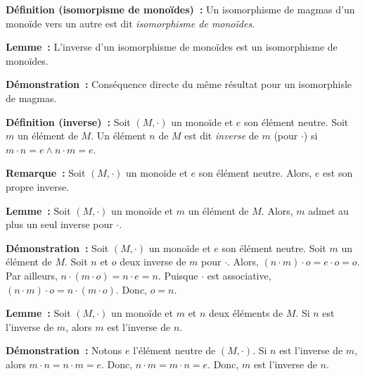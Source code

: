 \medskip

\noindent\textbf{Définition (isomorpisme de monoïdes) :} Un isomorphisme de magmas d'un monoïde vers un autre est dit \textit{isomorphisme de monoïdes}.

\medskip

\noindent\textbf{Lemme :} L'inverse d'un isomorphisme de monoïdes est un isomorphisme de monoïdes.

\medskip

\noindent\textbf{Démonstration :} Conséquence directe du même résultat pour un isomorphisle de magmas.

\medskip

\noindent\textbf{Définition (inverse) :} Soit $(M,\cdot)$ un monoïde et $e$ son élément neutre. 
    Soit $m$ un élément de $M$. 
    Un élément $n$ de $M$ est dit \textit{inverse} de $m$ (pour $\cdot$) si $m \cdot n = e \wedge  n \cdot m = e$.

\medskip

\noindent\textbf{Remarque :} Soit $(M,\cdot)$ un monoïde et $e$ son élément neutre.
    Alors, $e$ est son propre inverse.
    
\medskip

\noindent\textbf{Lemme :} Soit $(M,\cdot)$ un monoïde et $m$ un élément de $M$.
    Alors, $m$ admet au plus un seul inverse pour $\cdot$.

\medskip

\noindent\textbf{Démonstration :} Soit $(M,\cdot)$ un monoïde et $e$ son élément neutre. 
    Soit $m$ un élément de $M$. 
    Soit $n$ et $o$ deux inverse de $m$ pour $\cdot$. 
    Alors, $(n \cdot m) \cdot o = e \cdot o = o$.
    Par ailleurs, $n \cdot (m \cdot o) = n \cdot e = n$.
    Puisque $\cdot$ est associative, $(n \cdot m) \cdot o = n \cdot (m \cdot o)$. 
    Donc, $o = n$.

    \hfill \square

\medskip

\noindent\textbf{Lemme :} Soit $(M,\cdot)$ un monoïde et $m$ et $n$ deux éléments de $M$.
    Si $n$ est l'inverse de $m$, alors $m$ est l'inverse de $n$.

\medskip

\noindent\textbf{Démonstration :} 
    Notons $e$ l'élément neutre de $(M, \cdot)$.
    Si $n$ est l'inverse de $m$, alors $m \cdot n = n \cdot m = e$.
    Donc, $n \cdot m = m \cdot n = e$.
    Donc, $m$ est l'inverse de $n$.

    \done

\medskip

